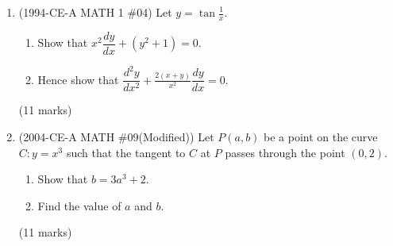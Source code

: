 \documentclass[12pt]{article}
\begin{document}
\begin{enumerate}
            \hrulefill

        \pagebreak
        \item (1994-CE-A MATH 1 \#04) Let $\displaystyle y=\tan{\frac{1}{x}}$. \begin{enumerate}
            \item Show that $x^2\dfrac{dy}{dx}+(y^2+1)=0$.
            \item Hence show that $\displaystyle\dfrac{d^2y}{dx^2}+\frac{2(x+y)}{x^2}\dfrac{dy}{dx}=0$.
        \end{enumerate}\hfill(11 marks)
        
            \hrulefill
            
            \hrulefill
            
            \hrulefill
            
            \hrulefill
            
            \hrulefill
            
            \hrulefill
            
            \hrulefill
            
            \hrulefill
            
            \hrulefill
            
            \hrulefill
            
            \hrulefill

            \hrulefill
            
            \hrulefill
            
            \hrulefill
            
            \hrulefill
            
            \hrulefill
            
            \hrulefill
            
            \hrulefill
            
            \hrulefill
            
            \hrulefill
            
            \hrulefill

        \pagebreak
        \item (2004-CE-A MATH \#09(Modified)) Let $P(a,b)$ be a point on the curve $C:y=x^3$ such that the tangent to $C$ at $P$ passes through the point $(0,2)$. \begin{enumerate}
            \item Show that $b=3a^3+2$.
            \item Find the value of $a$ and $b$.
        \end{enumerate}\hfill(11 marks)
            

\end{enumerate}
\end{document}
